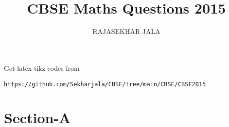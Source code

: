 \documentclass[journal,12pt,twocolumn]{IEEEtran}
\begin{document}
     \def\rightbox#1{\makebox[0in][r]{#1}}
     \def\centbox#1{\makebox[0in]{#1}}
     \def\topbox#1{\raisebox{-\baselineskip}[0in][0in]{#1}}
     \def\midbox#1{\raisebox{-0.5\baselineskip}[0in][0in]{#1}}
\vspace{3cm}
\title{CBSE Maths Questions 2015}
\author{RAJASEKHAR JALA }
\maketitle
\newpage
\bigskip
\renewcommand{\thefigure}{\theenumi}
\renewcommand{\thetable}{\theenumi}
%
Get latex-tikz codes from 
%
\begin{lstlisting}
https://github.com/Sekharjala/CBSE/tree/main/CBSE/CBSE2015
\end{lstlisting}
\section{Section-A}
\end{document}
